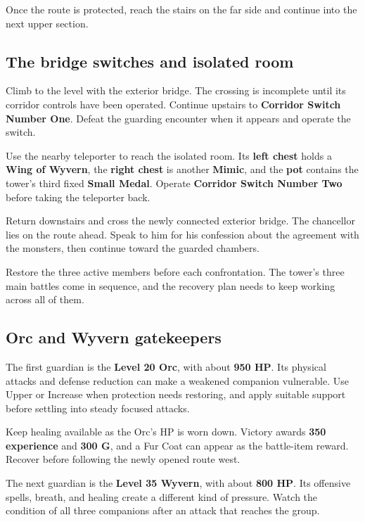 Once the route is protected, reach the stairs on the far side
and continue into the next upper section.

\subsection*{The bridge switches and isolated room}

Climb to the level with the exterior bridge. The crossing is
incomplete until its corridor controls have been operated.
Continue upstairs to \textbf{Corridor Switch Number One}.
Defeat the guarding encounter when it appears and operate the switch.

Use the nearby teleporter to reach the isolated room. Its
\textbf{left chest} holds a \textbf{Wing of Wyvern}, the
\textbf{right chest} is another \textbf{Mimic}, and the
\textbf{pot} contains the tower's third fixed \textbf{Small Medal}.
Operate \textbf{Corridor Switch Number Two} before taking the
teleporter back.

Return downstairs and cross the newly connected exterior bridge.
The chancellor lies on the route ahead. Speak to him for his
confession about the agreement with the monsters, then continue
toward the guarded chambers.

Restore the three active members before each confrontation.
The tower's three main battles come in sequence, and the recovery
plan needs to keep working across all of them.

\subsection{Orc and Wyvern gatekeepers}

The first guardian is the \textbf{Level 20 Orc}, with about
\textbf{950 HP}. Its physical attacks and defense reduction
can make a weakened companion vulnerable. Use Upper or Increase
when protection needs restoring, and apply suitable support before
settling into steady focused attacks.

Keep healing available as the Orc's HP is worn down. Victory
awards \textbf{350 experience} and \textbf{300 G}, and a
Fur Coat can appear as the battle-item reward. Recover before
following the newly opened route west.

The next guardian is the \textbf{Level 35 Wyvern}, with about
\textbf{800 HP}. Its offensive spells, breath, and healing
create a different kind of pressure. Watch the condition of all
three companions after an attack that reaches the group.

